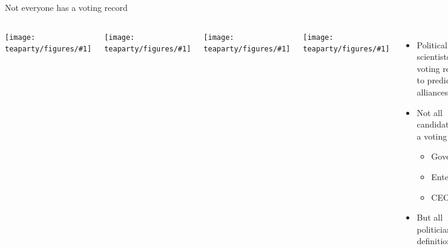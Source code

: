 \documentclass[compress]{beamer}
\newcommand{\gfxtp}[2]{
\begin{center}
	\texttt{[image: teaparty/figures/\#1]}
\end{center}
}
\begin{document}
\begin{frame}{Not everyone has a voting record}

  \begin{columns}
        \gfxtp{carson}{.75}
        \gfxtp{fiorina}{.75}
        \gfxtp{walker}{.75}
        \gfxtp{schwarzenegger}{.75}

    \begin{itemize}
      \item Political scientists use voting records to predict alliances
      \item Not all candidates have a voting record
        \begin{itemize}
          \item Governors
          \item Entertainers
          \item CEOs
        \end{itemize}
        \pause
       \item But all politicians---by definition---talk
      \end{itemize}
  \end{columns}

\end{frame}


\end{document}
